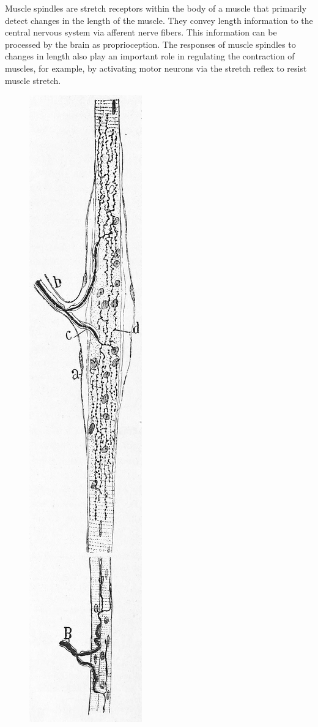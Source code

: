 Muscle spindles are stretch receptors within the body of a muscle that primarily detect changes in the length of the muscle. They convey length information to the central nervous system via afferent nerve fibers. This information can be processed by the brain as proprioception. The responses of muscle spindles to changes in length also play an important role in regulating the contraction of muscles, for example, by activating motor neurons via the stretch reflex to resist muscle stretch.



\begin{figure}

{\centering \includegraphics[width=0.7\linewidth]{./figures/somatosensory/CajalMuscleSpindle} 

}
\end{figure}
